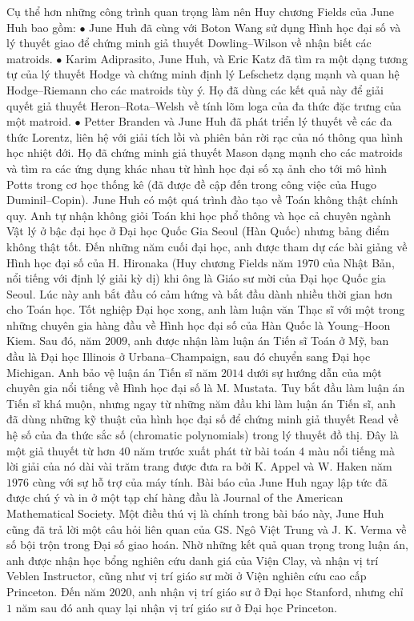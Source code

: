 \begin{multicols}{2}
	\vskip 0.05cm
	Cụ thể hơn những công trình quan trọng làm nên Huy chương Fields của June Huh bao gồm:
	\vskip 0.05cm
	$\bullet$ June Huh đã cùng với Boton Wang sử dụng Hình học đại số và lý thuyết giao để chứng minh giả thuyết Dowling--Wilson về nhận biết các matroids. 
	\vskip 0.05cm
	$\bullet$ Karim Adiprasito, June Huh, và Eric Katz đã tìm ra một dạng tương tự của lý thuyết Hodge và chứng minh định lý Lefschetz dạng mạnh và quan hệ Hodge--Riemann cho các matroids tùy ý. Họ đã dùng các kết quả này để giải quyết giả thuyết Heron--Rota--Welsh về tính lõm loga của đa thức đặc trưng của một matroid. 
	\vskip 0.05cm
	$\bullet$ Petter Branden và June Huh đã phát triển lý thuyết về các đa thức Lorentz, liên hệ với giải tích lồi và phiên bản rời rạc của nó thông qua hình học nhiệt đới. Họ đã chứng minh giả thuyết Mason dạng mạnh cho các matroids và tìm ra các ứng dụng khác nhau từ hình học đại số xạ ảnh cho tới mô hình Potts trong cơ học thống kê (đã được đề cập đến trong công việc của Hugo Duminil--Copin).
	\vskip 0.05cm 
	June Huh có một quá trình đào tạo về Toán không thật chính quy. Anh tự nhận không giỏi Toán khi học phổ thông và học cả chuyên ngành Vật lý ở bậc đại học ở Đại học Quốc Gia Seoul (Hàn Quốc) nhưng bảng điểm không thật tốt. Đến những năm cuối đại học, anh được tham dự các bài giảng về Hình học đại số của H. Hironaka (Huy chương Fields năm $1970$ của Nhật Bản, nổi tiếng với định lý giải kỳ dị) khi ông là Giáo sư mời của Đại học Quốc gia Seoul. Lúc này anh bắt đầu có cảm hứng và bắt đầu dành nhiều thời gian hơn cho Toán học. Tốt nghiệp Đại học xong, anh làm luận văn Thạc sĩ với một trong những chuyên gia hàng đầu về Hình học đại số của Hàn Quốc là Young--Hoon Kiem. Sau đó, năm $2009$, anh được nhận làm luận án Tiến sĩ Toán ở Mỹ, ban đầu là Đại học Illinois ở Urbana--Champaign, sau đó chuyển sang Đại học Michigan. Anh bảo vệ luận án Tiến sĩ năm $2014$ dưới sự hướng dẫn của một chuyên gia nổi tiếng về Hình học đại số là M. Mustata. Tuy bắt đầu làm luận án Tiến sĩ khá muộn, nhưng ngay từ những năm đầu khi làm luận án Tiến sĩ, anh đã dùng những kỹ thuật của hình học đại số để chứng minh giả thuyết Read về hệ số của đa thức sắc số (chromatic polynomials) trong lý thuyết đồ thị. Đây là một giả thuyết từ hơn $40$ năm trước xuất phát từ bài toán $4$ màu nổi tiếng mà lời giải của nó dài vài trăm trang được đưa ra bởi K. Appel và W. Haken năm $1976$ cùng với sự hỗ trợ của máy tính. Bài báo của June Huh ngay lập tức đã được chú ý và in ở một tạp chí hàng đầu là Journal of the American Mathematical Society. Một điều thú vị là chính trong bài báo này, June Huh cũng đã trả lời một câu hỏi liên quan của GS. Ngô Việt Trung và J. K. Verma về số bội trộn trong Đại số giao hoán. Nhờ những kết quả quan trọng trong luận án, anh được nhận học bổng nghiên cứu danh giá của Viện Clay, và nhận vị trí Veblen Instructor, cũng như vị trí giáo sư mời ở Viện nghiên cứu cao cấp Princeton. Đến năm $2020$, anh nhận vị trí giáo sư ở Đại học Stanford, nhưng chỉ $1$ năm sau đó anh quay lại nhận vị trí giáo sư ở Đại học Princeton.     

\end{multicols}

